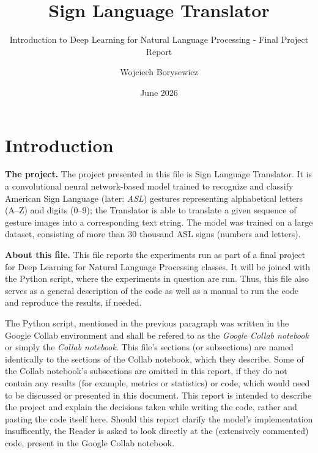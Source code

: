 \documentclass{article}
\title{Sign Language Translator}
\subtitle{Introduction to Deep Learning for Natural Language Processing - Final Project Report}
\author{Wojciech Borysewicz}
\date{June 2026}
\begin{document}
\maketitle

\section{Introduction}
\label{sec:1}
\textbf{The project.} The project presented in this file is Sign Language Translator. It is a convolutional neural network-based model trained to 
recognize and classify American Sign Language (later: \textit{ASL}) gestures representing alphabetical letters (A–Z) and digits (0–9); 
the Translator is able to translate a given sequence of gesture images into a corresponding text string. The model was trained on a large dataset, 
consisting of more than 30 thousand ASL signs (numbers and letters).  
\newline

\noindent\textbf{About this file.} This file reports the experiments run as part of a final project for Deep Learning for Natural Language Processing classes. 
It will be joined with the Python script, where the experiments in question are run. Thus, this file also serves as a general description of 
the code as well as a manual to run the code and reproduce the results, if needed.  

The Python script, mentioned in the previous paragraph was written in the Google Collab environment and shall be refered to as the \textit{Google Collab notebook} 
or simply the \textit{Collab notebook}. This file's sections (or subsections) are named identically to the sections of the Collab notebook, which they
describe. Some of the Collab notebook's subsections are omitted in this report, if they do not contain any results (for example, metrics or statistics) 
or code, which would need to be discussed or presented in this document. This report is intended to describe the project and explain the decisions taken 
while writing the code, rather and pasting the code itself here. Should this report clarify the model's implementation insufficently, the Reader is asked to
look directly at the (extensively commented) code, present in the Google Collab notebook.  
\end{document}
